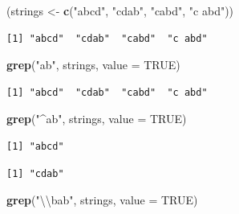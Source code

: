 \documentclass[]{book}
\newenvironment{Shaded}{\begin{snugshade}}{\end{snugshade}}
\newcommand{\CharTok}[1]{\textcolor[rgb]{0.31,0.60,0.02}{#1}}
\newcommand{\DataTypeTok}[1]{\textcolor[rgb]{0.13,0.29,0.53}{#1}}
\newcommand{\KeywordTok}[1]{\textcolor[rgb]{0.13,0.29,0.53}{\textbf{#1}}}
\newcommand{\NormalTok}[1]{#1}
\newcommand{\OtherTok}[1]{\textcolor[rgb]{0.56,0.35,0.01}{#1}}
\newcommand{\StringTok}[1]{\textcolor[rgb]{0.31,0.60,0.02}{#1}}
\theoremstyle{definition}
\theoremstyle{definition}
\theoremstyle{definition}
\theoremstyle{remark}
\begin{document}
\begin{Shaded}
\begin{Highlighting}[]
\NormalTok{(strings <-}\StringTok{ }\KeywordTok{c}\NormalTok{(}\StringTok{"abcd"}\NormalTok{, }\StringTok{"cdab"}\NormalTok{, }\StringTok{"cabd"}\NormalTok{, }\StringTok{"c abd"}\NormalTok{))}
\end{Highlighting}
\end{Shaded}

\begin{verbatim}
[1] "abcd"  "cdab"  "cabd"  "c abd"
\end{verbatim}

\begin{Shaded}
\begin{Highlighting}[]
\KeywordTok{grep}\NormalTok{(}\StringTok{"ab"}\NormalTok{, strings, }\DataTypeTok{value =} \OtherTok{TRUE}\NormalTok{)}
\end{Highlighting}
\end{Shaded}

\begin{verbatim}
[1] "abcd"  "cdab"  "cabd"  "c abd"
\end{verbatim}

\begin{Shaded}
\begin{Highlighting}[]
\KeywordTok{grep}\NormalTok{(}\StringTok{"^ab"}\NormalTok{, strings, }\DataTypeTok{value =} \OtherTok{TRUE}\NormalTok{)}
\end{Highlighting}
\end{Shaded}

\begin{verbatim}
[1] "abcd"
\end{verbatim}

\begin{Shaded}
\end{Shaded}

\begin{verbatim}
[1] "cdab"
\end{verbatim}

\begin{Shaded}
\begin{Highlighting}[]
\KeywordTok{grep}\NormalTok{(}\StringTok{"}\CharTok{\textbackslash{}\textbackslash{}}\StringTok{bab"}\NormalTok{, strings, }\DataTypeTok{value =} \OtherTok{TRUE}\NormalTok{)}
\end{Highlighting}
\end{Shaded}
\end{document}
